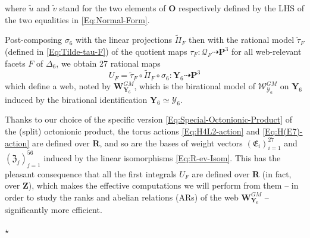 \documentclass[11pt]{amsart}
\newcommand{\sk}{\smallskip}
\begin{document}
where $\tilde u$ and $\tilde v$ stand for the two elements of $\mathbf O$ respectively defined by  the LHS of the two equalities in \eqref{Eq:Normal-Form}. 

Post-composing $\sigma_6$ with the linear projections $\tilde \Pi_F$ then with the rational model $\tilde \tau_F$ (defined in \eqref{Eq:Tilde-tau-F}) of the quotient maps $\tau_F : \boldsymbol{\mathcal Q}_F\dashrightarrow \mathbf P^3$ 
 for all web-relevant facets $F$ of $\Delta_6$, we obtain 27 rational maps 
 \begin{equation} %
 U_F = \tilde \tau_F \circ \tilde \Pi_F \circ \sigma_6 : \boldsymbol{Y}_6 \dashrightarrow \mathbf P^3
 \end{equation} %
 which define a web, noted by $\boldsymbol{W}_{\boldsymbol{Y}_6}^{GM}$, which is the birational model of $\boldsymbol{\mathcal W}_{\boldsymbol{\mathcal Y}_6}^{GM}$ on $\boldsymbol{Y}_6$ induced  by the birational identification  $\boldsymbol{Y}_6\simeq \boldsymbol{\mathcal Y}_6$. 
 
Thanks to our choice of the specific version
\eqref{Eq:Special-Octonionic-Product} of the (split) octonionic product, the torus actions 
\eqref{Eq:H4L2-action} and \eqref{Eq:H(E7)-action} 
 are defined over \( \mathbf{R} \), and so are the bases of weight vectors
 $(\mathfrak E_i)_{i=1}^{27}$ and $(\mathfrak Z_j)_{j=1}^{56}$
 induced by the linear isomorphisms \eqref{Eq:R-ev-Isom}. 
 This has the pleasant consequence that all the first integrals \( U_F \) are defined over \( \mathbf{R} \) (in fact, over \( \mathbf{Z} \)), which makes the effective computations we will perform from them -- in order to study the ranks and abelian relations (ARs) of the web $\boldsymbol{W}_{\boldsymbol{Y}_6}^{GM}$  -- significantly more efficient.
 \begin{center}
\vspace{-0.2cm}
$\star$\sk
\end{center}
 
\end{document}
